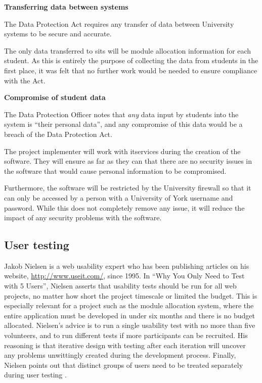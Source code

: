\documentclass[]{scrartcl}
\begin{document}
\textbf{Transferring data between systems}

The Data Protection Act requires any transfer of data between University
systems to be secure and accurate.

The only data transferred to \gls{sits} will be module allocation information
for each student. As this is entirely the purpose of collecting the data from
students in the first place, it was felt that no further work would be needed
to ensure compliance with the Act.

\textbf{Compromise of student data}

The Data Protection Officer notes that \emph{any} data input by students into the
system is ``their personal data'', and any compromise of this data would be a
breach of the Data Protection Act.

The project implementer will work with \gls{itservices} during the creation of
the software. They will ensure as far as they can that there are no security
issues in the software that would cause personal information to be compromised.

Furthermore, the software will be restricted by the University firewall so
that it can only be accessed by a person with a University of York username
and password. While this does not completely remove any issue, it will reduce
the impact of any security problems with the software.

\subsection{User testing}

Jakob Nielsen is a web usability expert who has been publishing articles on
his website, \url{http://www.useit.com/}, since 1995. In ``Why You Only Need to
Test with 5 Users'', Nielsen asserts that usability tests should be run for all
web projects, no matter how short the project timescale or limited the budget.
This is especially relevant for a project such as the module allocation
system, where the entire application must be developed in under six months and
there is no budget allocated. Nielsen's advice is to run a single usability
test with no more than five volunteers, and to run different tests if more
participants can be recruited. His reasoning is that iterative design with
testing after each iteration will uncover any problems unwittingly created
during the development process. Finally, Nielsen points out that distinct
groups of users need to be treated separately during user testing
\cite{nielsen2000fiveusers}.
\end{document}
